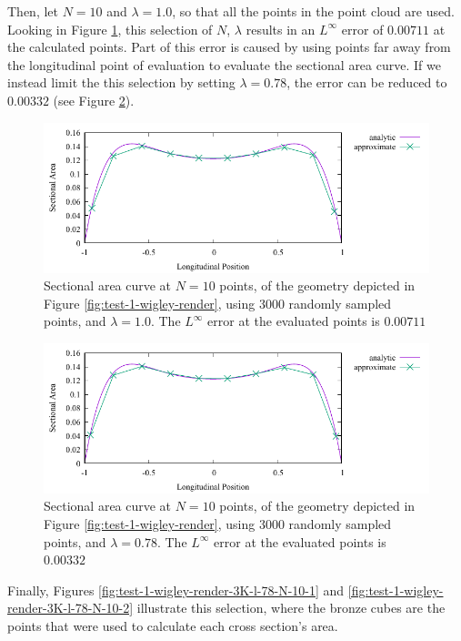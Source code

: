 \documentclass{report}
\begin{document}
\newpar Then, let $N=10$ and $\lambda = 1.0$, so that all the points in the point cloud are used. Looking in Figure \ref{fig:test-1-sac-3K-l-100-N-10}, this selection
of $N$, $\lambda$ results in an $L^\infty$ error of $0.00711$ at the calculated points. Part of this error is caused by using points 
far away from the longitudinal point of evaluation to evaluate the sectional area curve. If we instead limit the this selection by setting 
$\lambda = 0.78$, the error can be reduced to $0.00332$ (see Figure \ref{fig:test-1-sac-3K-l-78-N-10}).
\begin{figure}[H]
    \centering
    \includegraphics[width=0.7\linewidth]{figures/test-1-sac-3K-l-100-N-10.pdf}
    \caption{Sectional area curve at $N=10$ points, of the geometry depicted in Figure \ref{fig:test-1-wigley-render},
    using 3000 randomly sampled points, and $\lambda = 1.0$. The $L^\infty$ error at the evaluated points is $0.00711$}
    \label{fig:test-1-sac-3K-l-100-N-10}
\end{figure}
\begin{figure}[H]
    \centering
    \includegraphics[width=0.7\linewidth]{figures/test-1-sac-3K-l-78-N-10.pdf}
    \caption{Sectional area curve at $N=10$ points, of the geometry depicted in Figure \ref{fig:test-1-wigley-render},
    using 3000 randomly sampled points, and $\lambda = 0.78$. The $L^\infty$ error at the evaluated points is $0.00332$}
    \label{fig:test-1-sac-3K-l-78-N-10}
\end{figure}
\newpar Finally, Figures \ref{fig:test-1-wigley-render-3K-l-78-N-10-1} and \ref{fig:test-1-wigley-render-3K-l-78-N-10-2} illustrate
this selection, where the bronze cubes are the points that were used to calculate each cross section's area.
\end{document}
